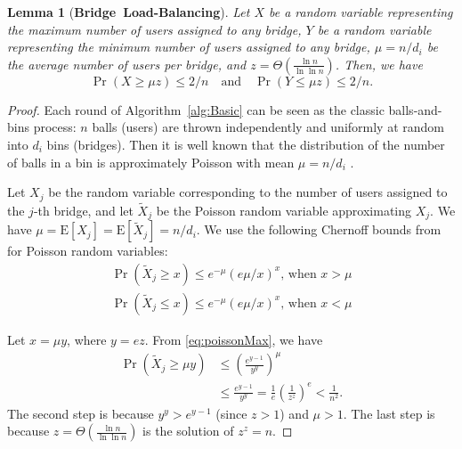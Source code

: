 \documentclass[letterpaper,twocolumn,10pt]{article}
\newcommand{\E}{\mathbf{\mathrm{E}}}
\newtheorem{lemma}{Lemma}
\newcommand{\sfsize}{\fontsize{0.73\baselineskip}{0.73\baselineskip}\selectfont}
\newcommand{\sans}[1]{\textsf{\sfsize \mbox{#1}}}
\newcommand{\sansb}[1]{\textbf{\sans{\mbox{#1}}}}
\begin{document}
\begin{lemma}[\sansb{Bridge Load-Balancing}]
	Let $X$ be a random variable representing the maximum number of users assigned to any bridge, $Y$ be a random variable representing the minimum number of users assigned to any bridge, ${\mu = n/d_i}$ be the average number of users per bridge, and $z = \Theta\left(\frac{\ln{n}}{\ln{\ln{n}}}\right)$. Then, we have 
	\[
	\Pr\left(X \geq \mu z\right) \leq 2/n \quad \text{and} \quad 
	\Pr\left(Y \leq \mu z\right) \leq 2/n.
	\]
\end{lemma}
\begin{proof}
	Each round of Algorithm~\ref{alg:Basic} can be seen as the classic balls-and-bins process: $n$ balls (users) are thrown independently and uniformly at random into $d_i$ bins (bridges). Then it is well known that the distribution of the number of balls in a bin is approximately Poisson with mean ${\mu = n/d_i}$ \cite[Chapter~5]{Michael2005}.
	
	Let $X_j$ be the random variable corresponding to the number of users assigned to the $j$-th bridge, and let $\tilde{X}_j$ be the Poisson random variable approximating $X_j$. We have ${\mu = \E[X_j] = \E[\tilde{X}_j] = n/d_i}$. We use the following Chernoff bounds from \cite[Chapter~5]{Michael2005} for Poisson random variables:
	\begin{align}
	\Pr(\tilde{X}_j \geq x) \leq e^{-\mu}(e\mu/x)^x \text{, when } x > \mu \label{eq:poissonMax}\\
	\Pr(\tilde{X}_j \leq x) \leq e^{-\mu}(e\mu/x)^x \text{, when } x < \mu \label{eq:poissonMin}
	\end{align}
	
	\noindent Let ${x = \mu y}$, where ${y = ez}$. From \eqref{eq:poissonMax}, we have
	\begin{align}
	\Pr(\tilde{X}_j \geq \mu y) &\leq \left(\frac{e^{y-1}}{y^y}\right)^\mu \nonumber \\
	&\leq \frac{e^{y-1}}{y^y} 
	= \frac{1}{e}\left(\frac{1}{z^z}\right)^e < \frac{1}{n^2}. \label{eq:approxBound}
	\end{align}
	The second step is because ${y^y > e^{y-1}}$ (since ${z > 1}$) and ${\mu > 1}$. The last step is because ${z = \Theta\left(\frac{\ln{n}}{\ln{\ln{n}}}\right)}$ is the solution of ${z^z = n}$. %
	

\end{proof}
\end{document}
